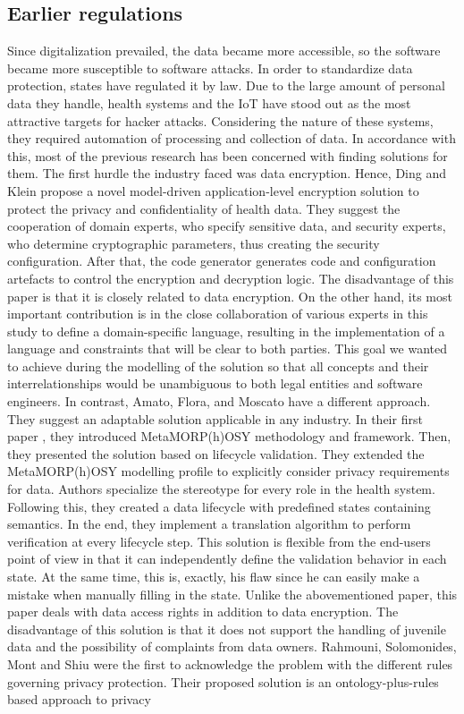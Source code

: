 \documentclass[11pt,english]{article}
\begin{document}
\subsection{Earlier regulations}
Since digitalization prevailed, the data became more accessible, so the software became more susceptible to software attacks. In order to standardize data protection, states have regulated it by law. Due to the large amount of personal data they handle, health systems and the IoT \cite{iot} have stood out as the most attractive targets for hacker attacks. Considering the nature of these systems, they required automation of processing and collection of data. In accordance with this, most of the previous research has been concerned with finding solutions for them. \newline The first hurdle the industry faced was data encryption. Hence, Ding and Klein \cite{encryptionLevel} propose a novel model-driven application-level encryption solution to protect the privacy and confidentiality of health data. They suggest the cooperation of domain experts, who specify sensitive data, and security experts, who determine cryptographic parameters, thus creating the security configuration. After that, the code generator generates code and configuration artefacts to control the encryption and decryption logic. The disadvantage of this paper is that it is closely related to data encryption. On the other hand, its most important contribution is in the close collaboration of various experts in this study to define a domain-specific language, resulting in the implementation of a language and constraints that will be clear to both parties. This goal we wanted to achieve during the modelling of the solution so that all concepts and their interrelationships would be unambiguous to both legal entities and software engineers. In contrast, Amato, Flora, and Moscato have a different approach. They suggest an adaptable solution applicable in any industry. In their first paper \cite{6245777}, they introduced MetaMORP(h)OSY methodology and framework. Then, they presented the solution \cite{amato2015model} based on lifecycle validation. They extended the MetaMORP(h)OSY modelling profile to explicitly consider privacy requirements for data. Authors specialize the stereotype for every role in the health system. Following this, they created a data lifecycle with predefined states containing semantics. In the end, they implement a translation algorithm to perform verification at every lifecycle step. This solution is flexible from the end-users point of view in that it can independently define the validation behavior in each state. At the same time, this is, exactly, his flaw since he can easily make a mistake when manually filling in the state. Unlike the abovementioned paper, this paper deals with data access rights in addition to data encryption. The disadvantage of this solution is that it does not support the handling of juvenile data and the possibility of complaints from data owners. \newline Rahmouni, Solomonides, Mont and Shiu \cite{rahmouni2011model} were the first to acknowledge the problem with the different rules governing privacy protection. Their proposed solution is an ontology-plus-rules based approach to privacy 
\end{document}
